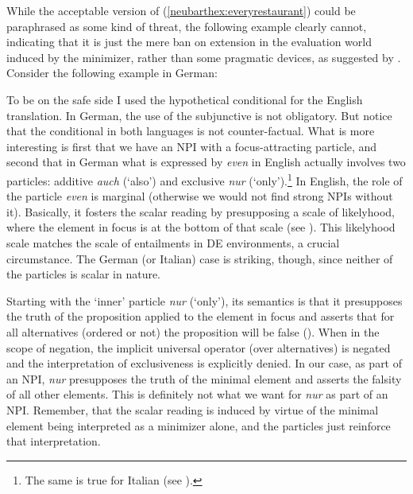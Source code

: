 \documentclass[output=paper,colorlinks,citecolor=brown,
]{langscibook}
\begin{document}
While the acceptable version of (\ref{neubarthex:everyrestaurant}) could be paraphrased as some kind of threat, the following
example clearly cannot, indicating that it is just the mere ban on extension in the evaluation world induced by the
minimizer, rather than some pragmatic devices, as suggested by \citet{linebarger1987}. Consider the following example
in German:


To be on the safe side I used the hypothetical conditional for the English translation. In German, the use of the
subjunctive is not obligatory. But notice that the conditional in both languages is not counter-factual. What is more
interesting is first that we have an NPI with a focus-attracting particle, and second that in German what is expressed
by \textit{even} in English actually involves two particles: additive \textit{auch} (`also') and exclusive \textit{nur}
(`only').\footnote{The same is true for Italian (see \citet{guerzoni03}).} In English, the role of the particle
\textit{even} is marginal (otherwise we would not find strong NPIs without it). Basically, it fosters the scalar
reading by presupposing a scale of likelyhood, where the element in focus is at the bottom of that scale (see
\citet{leehorn1994}). This likelyhood scale matches the scale of entailments in DE environments, a crucial
circumstance. The German (or Italian) case is striking, though, since neither of the particles is scalar in nature.

Starting with the `inner' particle \textit{nur} (`only'), its semantics is that it presupposes the truth of the
proposition applied to the element in focus and asserts that for all alternatives (ordered or not) the proposition will
be false (\citet{krifka1998,wagner2005}). When in the scope of negation, the implicit universal operator (over
alternatives) is negated and the interpretation of exclusiveness is explicitly denied. In our case, as part of an NPI,
\textit{nur} presupposes the truth of the minimal element and asserts the falsity of all other elements. This is
definitely not what we want for \textit{nur} as part of an NPI. Remember, that the scalar reading is induced by virtue
of the minimal element being interpreted as a minimizer alone, and the particles just reinforce that interpretation.
\end{document}
